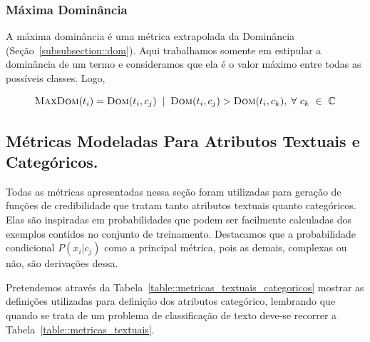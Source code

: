
\subsubsection{Máxima Dominância}
\label{subsubsection::maxdom}
A máxima dominância é uma métrica extrapolada da Dominância (Seção~\ref{subsubsection::dom}). Aqui trabalhamos somente em estipular a dominância de um termo e consideramos que ela é o valor máximo entre todas as possíveis classes. Logo,

\begin{equation}\label{eqn::maxdom}
 \textsc{MaxDom}(t_i) = \textsc{Dom}(t_i,c_j) \; \; | \;\; \textsc{Dom}(t_i, c_j) > \textsc{Dom}(t_i, c_k), \; \forall\ c_k\ \in\ \mathbb{C}
\end{equation}

%

\subsection{Métricas Modeladas Para Atributos Textuais e Categóricos.}
\label{subsec::pg_metricas_conteudo}


Todas as métricas apresentadas nessa seção foram utilizadas para geração de funções de credibilidade que tratam tanto atributos textuais quanto categóricos. 
Elas são inspiradas em probabilidades que podem ser facilmente calculadas dos exemplos contidos no conjunto de treinamento. 
Destacamos que a probabilidade condicional $P(x_i|c_j)$ como a principal métrica, pois as demais, complexas ou não, são derivações dessa.

Pretendemos através da Tabela~\ref{table::metricas_textuais_categoricos} mostrar as definições utilizadas para definição dos atributos categórico, lembrando que quando se trata de um problema de classificação de texto deve-se recorrer a Tabela~\ref{table::metricas_textuais}.



